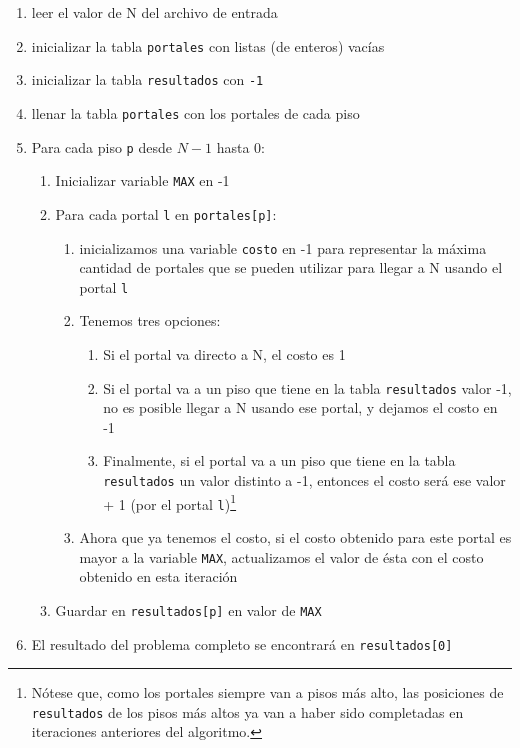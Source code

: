 \begin{enumerate}[label*=\bfseries\arabic*.]
 \item leer el valor de N del archivo de entrada
 \item inicializar la tabla \texttt{portales} con listas (de enteros) vacías
 \item inicializar la tabla \texttt{resultados} con \texttt{-1}
 \item llenar la tabla \texttt{portales} con los portales de cada piso
 \item Para cada piso \texttt{p} desde $N-1$ hasta 0:
 \begin{enumerate}[label*=\bfseries\arabic*.]
    \item Inicializar variable \texttt{MAX} en -1
    \item Para cada portal \texttt{l} en \texttt{portales[p]}:
    \begin{enumerate}[label*=\bfseries\arabic*.]
      \item inicializamos una variable \texttt{costo} en -1 para representar la máxima cantidad de portales que se pueden utilizar para llegar a N usando el portal \texttt{l}
      \item Tenemos tres opciones:
      \begin{enumerate}[label*=\bfseries\arabic*.]
	\item Si el portal va directo a N, el costo es 1
	\item Si el portal va a un piso que tiene en la tabla \texttt{resultados} valor -1, no es posible llegar a N usando ese portal, y dejamos el costo en -1
	\item Finalmente, si el portal va a un piso que tiene en la tabla \texttt{resultados} un valor distinto a -1, entonces el costo será ese valor + 1 (por el portal \texttt{l})\footnote{Nótese que, como los portales siempre van a pisos más alto, las posiciones de \texttt{resultados} de los pisos más altos ya van a haber sido completadas en iteraciones anteriores del algoritmo.} 
      \end{enumerate}

      \item Ahora que ya tenemos el costo, si el costo obtenido para este portal es mayor a la variable \texttt{MAX}, actualizamos el valor de ésta con el costo obtenido en esta iteración
    \end{enumerate}
    \item Guardar en \texttt{resultados[p]} en valor de \texttt{MAX}
 \end{enumerate}
 \item El resultado del problema completo se encontrará en \texttt{resultados[0]}
\end{enumerate}


